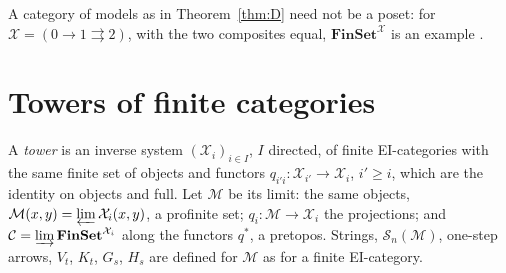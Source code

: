 \documentclass[11pt]{amsart}
\theoremstyle{definition}
\newcommand{\Fin}{\mathbf{FinSet}}
\newcommand{\cX}{\mathcal X}
\newcommand{\cC}{\mathcal C}
\newcommand{\cM}{\mathcal M}
\newcommand{\cS}{\mathcal S}
\begin{document}
A category of models as in Theorem~\ref{thm:D} need not be a poset:
for $\cX=(0\to1\rightrightarrows2)$, with the two composites equal,
$\Fin^\cX$ is an example \cite[Ex.~6.6]{Strings}.

\section{Towers of finite categories}\label{sec:towers}

A \emph{tower} is an inverse system $(\cX_i)_{i\in I}$, $I$ directed,
of finite EI-categories with the same finite set of objects and
functors $q_{i'i}\colon\cX_{i'}\to\cX_i$, $i'\ge i$, which are the
identity on objects and full. Let $\cM$ be its limit: the same
objects, $\cM(x,y)=\varprojlim\cX_i(x,y)$, a profinite set; $q_i\colon
\cM\to\cX_i$ the projections; and $\cC=\varinjlim\Fin^{\cX_i}$ along
the functors $q^*$, a pretopos. Strings, $\cS_n(\cM)$, one-step
arrows, $V_t$, $K_t$, $G_s$, $H_s$ are defined for $\cM$ as for a
finite EI-category.
\end{document}
